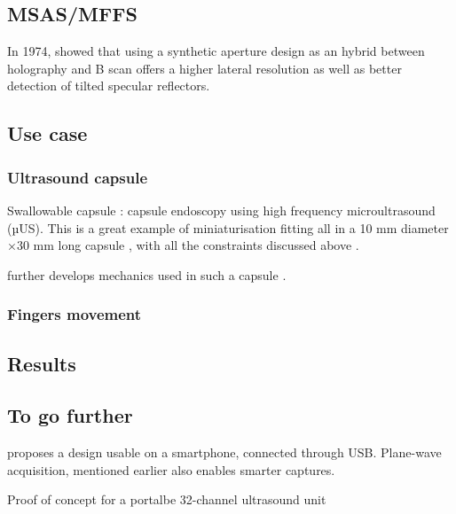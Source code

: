 \documentclass[conference]{IEEEtran}
\begin{document}
\subsection{MSAS/MFFS}

\cite{ylitalo_ultrasound_1994}

\cite{heuvel_development_2017}


In 1974, \cite{burckhardt_experimental_1974} showed that using a synthetic aperture design as an hybrid  between holography and B scan offers a higher lateral resolution as well as better detection of tilted specular reflectors.

\subsection{Use case}

\subsubsection{Ultrasound capsule}

Swallowable capsule : capsule endoscopy using  high frequency microultrasound (µUS). This is a great example of miniaturisation fitting all in a  10 mm diameter ×30 mm long capsule , with all the constraints discussed above \cite{cox_ultrasound_2017}.

further develops mechanics used in such a capsule \cite{wang_development_2017}.

\subsubsection{Fingers movement}

\cite{sikdar_novel_2014}

\subsection{Results}


\subsection{To go further}

\cite{kim_smart-phone_2017} proposes a design usable on a smartphone, connected through USB. Plane-wave acquisition, mentioned earlier \cite{hewener_mobile_2015} also enables smarter captures.


 
Proof of concept for a portalbe 32-channel ultrasound unit \cite{kim_single_2012}
\end{document}
